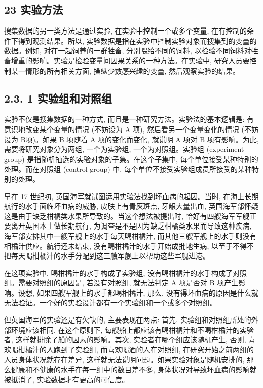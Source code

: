 \documentclass[10pt]{article}
\begin{document}
\begin{CJK*}{UTF8}{bsmi}
\section*{23 实验方法}
搜集数据的另一类方法是通过实验, 在实验中控制一个或多个变量, 在有控制的条件下得到观测结果。所以, 实验数据是指在实验中控制实验对象而搜集到的变量的数据。例如, 对在一起饲养的一群牲畜, 分别喂给不同的饲料, 以检验不同饲料对牲畜增重的影响。实验是检验变量间因果关系的一种方法。在实验中, 研究人员要控制某一情形的所有相关方面, 操纵少数感兴趣的变量, 然后观察实验的结果。

\subsection*{2.3. 1 实验组和对照组}
实验不仅是搜集数据的一种方式, 而且是一种研究方法。实验法的基本逻辑是: 有意识地改变某个变量的情况 (不妨设为 $\mathrm{A}$ 项), 然后看另一个变量变化的情况 (不妨设为 $\mathrm{B}$项)。如果 B 项随着 $\mathrm{A}$ 项的变化而变化, 就说明 $\mathrm{A}$ 项对 $\mathrm{B}$ 项有影响。为此, 需要将研究对象分为两组, 一个为实验组, 一个为对照组。实验组 (experiment group) 是指随机抽选的实验对象的子集。在这个子集中, 每个单位接受某种特别的处理。而在对照组 (control group) 中, 每个单位不接受实验组成员所接受的某种特别的处理。

早在 17 世纪初, 英国海军就试图运用实验法找到坏血病的起因。当时, 在海上长期航行的水手面临坏血病的威胁, 皮肤上有青灰斑点, 牙龈大量出血, 英国海军部怀疑这是由于缺乏柑橘类水果所导致的。当这个想法被提出时, 恰好有四艘海军军舰正要离开英国本土做长期航行, 为调查是不是因为缺乏柑橘类水果而导致这种疾病, 海军部安排其中一艘军舰上的水手每天喝柑橘汁, 而其他三艘军舰上的水手则没有相橘汁供应。航行还未结束, 没有喝柑橘汁的水手开始成批地生病, 以至于不得不把每天喝柑橘汁的水手分配到这三艘军舰上以帮助这些军舰进港。

在这项实验中, 喝柑橘汁的水手构成了实验组, 没有喝柑橘汁的水手构成了对照组。需要对照组的原因是, 若没有对照组, 就无法判定 A 项是否对 B 项产生影响。设想, 如果四艘军舰上的水手都喝相橘汁, 那么, 没有得坏血病的原因是什么就无法验证。一个好的实验设计都有一个实验组和一个或多个对照组。

但英国海军的实验还是有欠缺的, 主要表现在两点: 首先, 实验组和对照组所处的外部环境应该相同, 在这个原则下, 每艘船上都应该有喝柑橘汁和不喝柑橘汁的实验者, 这样就排除了船的因素的影响。其次, 实验者在哪个组应该随机产生, 否则, 喜欢喝柑橘汁的人跑到了实验组, 而喜欢喝酒的人在对照组, 在研究开始之前两组的人员身体状况就存在差异, 这样就无法说明问题。如果实验对象是随机安排的, 那么健康和不健康的水手在每一组中的数目差不多, 身体状况对导致坏血病的影响就被抵消了, 实验数据才有更高的可信度。


\end{CJK*}
\end{document}
